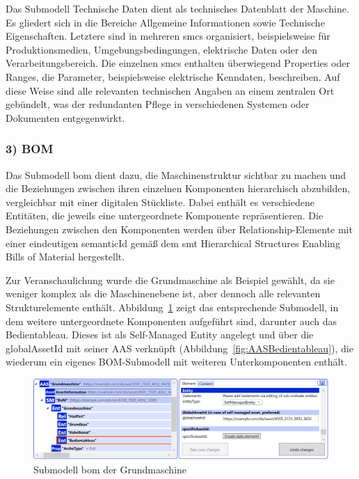 Das Submodell Technische Daten dient als technisches Datenblatt der Maschine.  
Es gliedert sich in die Bereiche Allgemeine Informationen sowie Technische Eigenschaften. 
Letztere sind in mehreren \acsp{smc} organisiert, beispielsweise für Produktionsmedien, Umgebungsbedingungen, elektrische Daten oder den Verarbeitungsbereich. 
Die einzelnen \acsp{smc} enthalten überwiegend Properties oder Ranges, die Parameter, beispielsweise elektrische Kenndaten, beschreiben.
Auf diese Weise sind alle relevanten technischen Angaben an einem zentralen Ort gebündelt, was der redundanten Pflege in verschiedenen Systemen oder Dokumenten entgegenwirkt. 

\subsubsection*{3) BOM}
\vspace{-0.5em}

Das Submodell \acs{bom} dient dazu, die Maschinenstruktur sichtbar zu machen und die Beziehungen zwischen ihren einzelnen Komponenten hierarchisch abzubilden, vergleichbar mit einer digitalen Stückliste.
Dabei enthält es verschiedene Entitäten, die jeweils eine untergeordnete Komponente repräsentieren.
Die Beziehungen zwischen den Komponenten werden über Relationship-Elemente mit einer eindeutigen semanticId gemäß dem \acs{smt} Hierarchical Structures Enabling Bills of Material \cite{SpezifikationHierachischeStrukturen} hergestellt.

Zur Veranschaulichung wurde die Grundmaschine als Beispiel gewählt, da sie weniger komplex als die Maschinenebene ist, aber dennoch alle relevanten Strukturelemente enthält.
Abbildung~\ref{fig:BOMSubmodelGrundmashcine} zeigt das entsprechende Submodell, in dem weitere untergeordnete Komponenten aufgeführt sind, darunter auch das Bedientableau.
Dieses ist als Self-Managed Entity angelegt und über die globalAssetId mit seiner AAS verknüpft (Abbildung~\ref{fig:AASBedientableau}), die wiederum ein eigenes BOM-Submodell mit weiteren Unterkomponenten enthält.

\begin{figure}[htbp]
    \centering
        \includegraphics[width=1\textwidth]{Bilder/ErgebnissePackageExplorer/AASGrundmaschine.PNG}
    \caption{Submodell \acs{bom} der Grundmaschine}
    \label{fig:BOMSubmodelGrundmashcine}
\end{figure}

